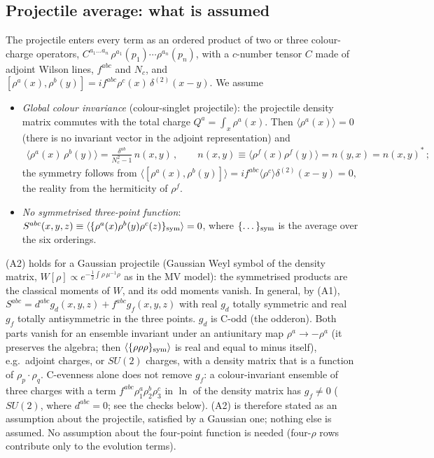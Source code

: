 \subsection{Projectile average: what is assumed}
\noindent The projectile enters every term as an ordered product of two or three colour-charge operators, $C^{a_{1}\dots a_{n}}\,\rho^{a_{1}}(p_{1})\cdots\rho^{a_{n}}(p_{n})$, with a $c$-number tensor $C$ made of adjoint Wilson lines, $f^{abc}$ and $N_{c}$, and $[\rho^{a}(x),\rho^{b}(y)]=if^{abc}\rho^{c}(x)\,\delta^{(2)}(x-y)$. We assume
\begin{itemize}
\item[(A1)] \emph{Global colour invariance} (colour-singlet projectile): the projectile density matrix commutes with the total charge $Q^{a}=\int_{x}\rho^{a}(x)$. Then $\langle\rho^{a}(x)\rangle=0$ (there is no invariant vector in the adjoint representation) and
\begin{align}
\langle\rho^{a}(x)\,\rho^{b}(y)\rangle=\frac{\delta^{ab}}{N_{c}^{2}-1}\,n(x,y)\,,\qquad n(x,y)\equiv\langle\rho^{f}(x)\rho^{f}(y)\rangle=n(y,x)=n(x,y)^{*}\,;\label{eq:s-A1}
\end{align}
the symmetry follows from $\langle[\rho^{a}(x),\rho^{b}(y)]\rangle=if^{abc}\langle\rho^{c}\rangle\delta^{(2)}(x-y)=0$, the reality from the hermiticity of $\rho^{f}$.
\item[(A2)] \emph{No symmetrised three-point function}: $S^{abc}(x,y,z)\equiv\langle\{\rho^{a}(x)\rho^{b}(y)\rho^{c}(z)\}_{\rm sym}\rangle=0$, where $\{\dots\}_{\rm sym}$ is the average over the six orderings.
\end{itemize}
(A2) holds for a Gaussian projectile (Gaussian Weyl symbol of the density matrix, $W[\rho]\propto e^{-\frac12\int\rho\,\mu^{-1}\rho}$ as in the MV model): the symmetrised products are the classical moments of $W$, and its odd moments vanish. In general, by (A1), $S^{abc}=d^{abc}g_{d}(x,y,z)+f^{abc}g_{f}(x,y,z)$ with real $g_{d}$ totally symmetric and real $g_{f}$ totally antisymmetric in the three points. $g_{d}$ is C-odd (the odderon). Both parts vanish for an ensemble invariant under an antiunitary map $\rho^{a}\to-\rho^{a}$ (it preserves the algebra; then $\langle\{\rho\rho\rho\}_{\rm sym}\rangle$ is real and equal to minus itself), e.g.\ adjoint charges, or $SU(2)$ charges, with a density matrix that is a function of $\rho_{p}\cdot\rho_{q}$. C-evenness alone does not remove $g_{f}$: a colour-invariant ensemble of three charges with a term $f^{abc}\rho^{a}_{1}\rho^{b}_{2}\rho^{c}_{3}$ in $\ln$ of the density matrix has $g_{f}\neq0$ ($SU(2)$, where $d^{abc}=0$; see the checks below). (A2) is therefore stated as an assumption about the projectile, satisfied by a Gaussian one; nothing else is assumed. No assumption about the four-point function is needed (four-$\rho$ rows contribute only to the evolution terms).

